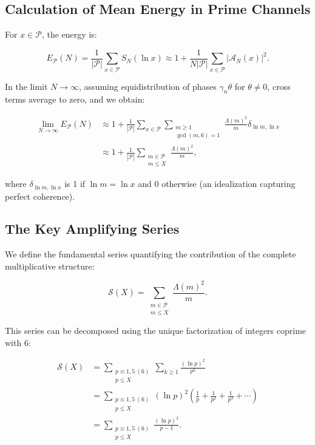 \documentclass[12pt, a4paper]{article}
\theoremstyle{plain}
\theoremstyle{definition}
\theoremstyle{remark}
\begin{document}
\subsection{Calculation of Mean Energy in Prime Channels}

For $x \in \mathcal{P}$, the energy is:

\[
E_{\mathcal{P}}(N) = \frac{1}{|\mathcal{P}|} \sum_{x \in \mathcal{P}} S_N(\ln x) \approx 1 + \frac{1}{N|\mathcal{P}|} \sum_{x \in \mathcal{P}} |\mathcal{A}_N(x)|^2.
\]

In the limit $N \to \infty$, assuming equidistribution of phases $\gamma_n \theta$ for $\theta \neq 0$, cross terms average to zero, and we obtain:

\begin{align*}
\lim_{N \to \infty} E_{\mathcal{P}}(N) &\approx 1 + \frac{1}{|\mathcal{P}|} \sum_{x \in \mathcal{P}} \sum_{\substack{m \geq 1 \\ \gcd(m,6)=1}} \frac{\Lambda(m)^2}{m} \delta_{\ln m, \ln x} \\
&\approx 1 + \frac{1}{|\mathcal{P}|} \sum_{\substack{m \in \mathcal{P} \\ m \leq X}} \frac{\Lambda(m)^2}{m},
\end{align*}

where $\delta_{\ln m, \ln x}$ is 1 if $\ln m = \ln x$ and 0 otherwise (an idealization capturing perfect coherence).

\subsection{The Key Amplifying Series}

We define the fundamental series quantifying the contribution of the complete multiplicative structure:

\[
\mathcal{S}(X) = \sum_{\substack{m \in \mathcal{P} \\ m \leq X}} \frac{\Lambda(m)^2}{m}.
\]

This series can be decomposed using the unique factorization of integers coprime with 6:

\begin{align*}
\mathcal{S}(X) &= \sum_{\substack{p \equiv 1,5 \ (6) \\ p \leq X}} \sum_{k \geq 1} \frac{(\ln p)^2}{p^k} \\
&= \sum_{\substack{p \equiv 1,5 \ (6) \\ p \leq X}} (\ln p)^2 \left( \frac{1}{p} + \frac{1}{p^2} + \frac{1}{p^3} + \cdots \right) \\
&= \sum_{\substack{p \equiv 1,5 \ (6) \\ p \leq X}} \frac{(\ln p)^2}{p-1}.
\end{align*}
\end{document}
